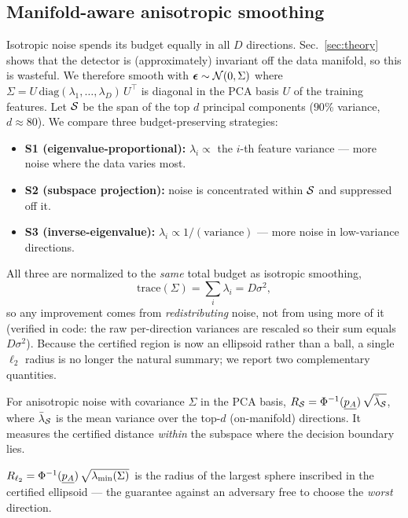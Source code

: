 \subsection{Manifold-aware anisotropic smoothing}
\label{ssec:aniso}

Isotropic noise spends its budget equally in all $D$ directions. Sec.~\ref{sec:theory} shows that the detector is (approximately) invariant off the data manifold, so this is wasteful. We therefore smooth with ${\boldsymbol \epsilon}\sim\mathcal{N}(0,\Sigma)$ where $\Sigma=U\,\mathrm{diag}(\lambda_1,\dots,\lambda_D)\,U^\top$ is diagonal in the PCA basis $U$ of the training features. Let $\mathcal{S}$ be the span of the top $d$ principal components ($90\%$ variance, $d\!\approx\!80$). We compare three budget-preserving strategies:
\begin{itemize}
\itemsep0.15em
\item \textbf{S1 (eigenvalue-proportional):} $\lambda_i \propto$ the $i$-th feature variance --- more noise where the data varies most.
\item \textbf{S2 (subspace projection):} noise is concentrated within $\mathcal{S}$ and suppressed off it.
\item \textbf{S3 (inverse-eigenvalue):} $\lambda_i \propto 1/(\text{variance})$ --- more noise in low-variance directions.
\end{itemize}
All three are normalized to the \emph{same} total budget as isotropic smoothing,
\begin{equation}
\mathrm{trace}(\Sigma)=\textstyle\sum_i \lambda_i = D\sigma^2,
\label{eq:budget}
\end{equation}
so any improvement comes from \emph{redistributing} noise, not from using more of it (verified in code: the raw per-direction variances are rescaled so their sum equals $D\sigma^2$). Because the certified region is now an ellipsoid rather than a ball, a single $\ell_2$ radius is no longer the natural summary; we report two complementary quantities.

\begin{definition}
For anisotropic noise with covariance $\Sigma$ in the PCA basis,
$R_{\mathcal{S}}=\Phi^{-1}(\underline{p_A})\,\sqrt{\bar\lambda_{\mathcal{S}}}$, where $\bar\lambda_{\mathcal{S}}$ is the mean variance over the top-$d$ (on-manifold) directions. It measures the certified distance \emph{within} the subspace where the decision boundary lies.
\end{definition}

\begin{definition}
$R_{\ell_2}=\Phi^{-1}(\underline{p_A})\,\sqrt{\lambda_{\min}(\Sigma)}$ is the radius of the largest sphere inscribed in the certified ellipsoid --- the guarantee against an adversary free to choose the \emph{worst} direction.
\end{definition}

